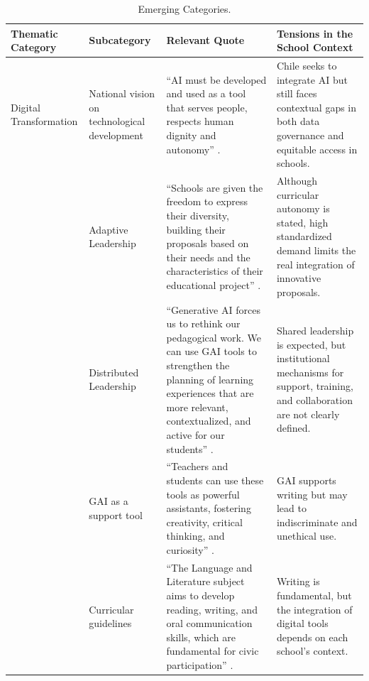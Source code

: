 \documentclass[english]{textolivre}
\begin{document}
\begin{table}[htbp]
\centering
\begin{threeparttable}
\caption{Emerging Categories.}
\label{tab2}

\footnotesize

\begin{tabularx}{\textwidth}{
>{\raggedright\arraybackslash}p{}
>{\raggedright\arraybackslash}p{}
X
>{\raggedright\arraybackslash}p{}}
\toprule
\textbf{Thematic Category} &
\textbf{Subcategory} &
\textbf{Relevant Quote} &
\textbf{Tensions in the School Context} \\
\midrule

Digital Transformation &
National vision on technological development &
``AI must be developed and used as a tool that serves people, respects human dignity and autonomy'' \cite[p. 22, own translation]{minciencia2024politica}. &
Chile seeks to integrate AI but still faces contextual gaps in both data governance and equitable access in schools. \\
\midrule

\multirow{2}{=}{Leadership}
&
Adaptive Leadership &
``Schools are given the freedom to express their diversity, building their proposals based on their needs and the characteristics of their educational project'' \cite[p.~20, own translation]{mineduc2019bases}. &
Although curricular autonomy is stated, high standardized demand limits the real integration of innovative proposals. \\

&
Distributed Leadership &
``Generative AI forces us to rethink our pedagogical work. We can use GAI tools to strengthen the planning of learning experiences that are more relevant, contextualized, and active for our students'' \cite[p.~9, own translation]{mineducchile2025potencia}. &
Shared leadership is expected, but institutional mechanisms for support, training, and collaboration are not clearly defined. \\
\midrule

\multirow{2}{=}{GAI and Writing}
&
GAI as a support tool &
``Teachers and students can use these tools as powerful assistants, fostering creativity, critical thinking, and curiosity'' \cite[p.~5, own translation]{mineduc2023chatgpt}. &
GAI supports writing but may lead to indiscriminate and unethical use. \\

&
Curricular guidelines &
``The Language and Literature subject aims to develop reading, writing, and oral communication skills, which are fundamental for civic participation'' \cite[p.~86, own translation]{mineduc2019bases}. &
Writing is fundamental, but the integration of digital tools depends on each school's context. \\
\midrule


\end{tabularx}
\end{threeparttable}
\end{table}
\end{document}
